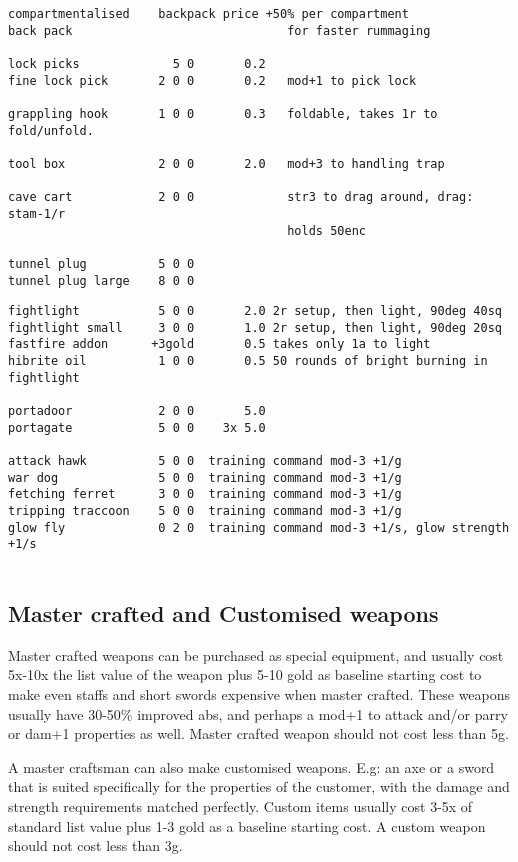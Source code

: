\begin{verbatim}
compartmentalised    backpack price +50% per compartment
back pack                              for faster rummaging

lock picks             5 0       0.2
fine lock pick       2 0 0       0.2   mod+1 to pick lock

grappling hook       1 0 0       0.3   foldable, takes 1r to fold/unfold.

tool box             2 0 0       2.0   mod+3 to handling trap

cave cart            2 0 0             str3 to drag around, drag: stam-1/r
                                       holds 50enc

tunnel plug          5 0 0
tunnel plug large    8 0 0

\end{verbatim} \goodbreak \begin{verbatim}
fightlight           5 0 0       2.0 2r setup, then light, 90deg 40sq
fightlight small     3 0 0       1.0 2r setup, then light, 90deg 20sq
fastfire addon      +3gold       0.5 takes only 1a to light
hibrite oil          1 0 0       0.5 50 rounds of bright burning in fightlight

portadoor            2 0 0       5.0
portagate            5 0 0    3x 5.0

attack hawk          5 0 0  training command mod-3 +1/g
war dog              5 0 0  training command mod-3 +1/g
fetching ferret      3 0 0  training command mod-3 +1/g
tripping traccoon    5 0 0  training command mod-3 +1/g
glow fly             0 2 0  training command mod-3 +1/s, glow strength +1/s


\end{verbatim}
\normalsize


\subsection*{Master crafted and Customised weapons}
Master crafted weapons can be purchased as special equipment, and usually cost 5x-10x the list value of the weapon plus 5-10 gold as baseline starting cost to make even staffs and short swords expensive when master crafted. These weapons usually have 30-50\% improved abs, and perhaps a mod+1 to attack and/or parry or dam+1 properties as well. Master crafted weapon should not cost less than 5g.

A master craftsman can also make customised weapons. E.g: an axe or a sword that is suited specifically for the properties of the customer, with the damage and strength requirements matched perfectly. Custom items usually cost 3-5x of standard list value plus 1-3 gold as a baseline starting cost. A custom weapon should not cost less than 3g.

